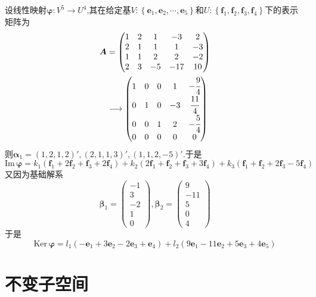 \begin{brown}
\begin{example}
    设线性映射$\bm{\varphi}:V^5\longrightarrow U^4$,其在给定基$V:\left\{
        \bm{e}_1,\bm{e}_2,\cdots,\bm{e}_5
    \right\}$和$U:\left\{
        \bm{f}_1,\bm{f}_2,\bm{f}_3,\bm{f}_4
    \right\}$下的表示矩阵为
    \begin{align*}
        \bm{A}&=\begin{pmatrix}
        1&2&1&-3&2\\
        2&1&1&1&-3\\
        1&1&2&2&-2\\
        2&3&-5&-17&10
    \end{pmatrix}\\
    &\longrightarrow
    \begin{pmatrix}
        1&0&0&1&-\cfrac{9}{4}\\
        0&1&0&-3&\cfrac{11}{4}\\
        0&0&1&2&-\cfrac{5}{4}\\
        0&0&0&0&0
    \end{pmatrix}
\end{align*}则$\bm{\alpha}_1=\left(1,2,1,2\right)',\left(2,1,1,3\right)',\left(1,1,2,-5\right)'.$于是\[
\mathrm{Im}\,\bm{\varphi}=k_1\left(
    \bm{f}_1+2\bm{f}_2+\bm{f}_3+2\bm{f}_4
\right)+k_2\left(
    2\bm{f}_1+\bm{f}_2+\bm{f}_3+3\bm{f}_4
\right)+k_3\left(
    \bm{f}_1+\bm{f}_2+2\bm{f}_3-5\bm{f}_4
\right)
\]又因为基础解系
\[
\bm{\beta}_1=\begin{pmatrix}
    -1\\3\\-2\\1\\0
\end{pmatrix},\bm{\beta}_2=\begin{pmatrix}
    9\\-11\\5\\0\\4
\end{pmatrix}
\]于是\[
\mathrm{Ker}\,\bm{\varphi}=l_1\left(
    -\bm{e}_1+3\bm{e}_2-2\bm{e}_3+\bm{e}_4
\right)+l_2\left(
    9\bm{e}_1-11\bm{e}_2+5\bm{e}_3+4\bm{e}_5
\right)
\]
\end{example}
\end{brown}
\newpage
\section{不变子空间}
